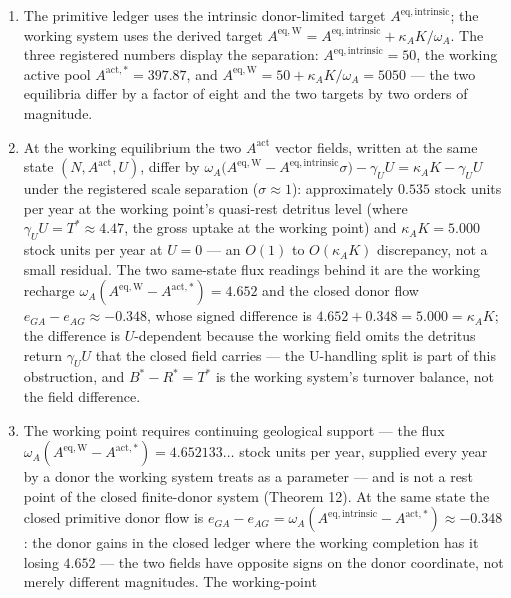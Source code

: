 \documentclass[11pt]{article}
\providecommand{\tightlist}{\setlength{\itemsep}{0pt}\setlength{\parskip}{0pt}}
\begin{document}
\begin{enumerate}
\def\labelenumi{\arabic{enumi}.}
\tightlist
\item
  The primitive ledger uses the intrinsic donor-limited target
  \(A^{\mathrm{eq,intrinsic}}\); the working system uses the derived
  target
  \(A^{\mathrm{eq,W}} = A^{\mathrm{eq,intrinsic}} + \kappa_A K/\omega_A\).
  The three registered numbers display the separation:
  \(A^{\mathrm{eq,intrinsic}} = 50\), the working active pool
  \(A^{\mathrm{act,*}} = 397.87\), and
  \(A^{\mathrm{eq,W}} = 50 + \kappa_A K/\omega_A = 5050\) --- the two
  equilibria differ by a factor of eight and the two targets by two
  orders of magnitude.
\item
  At the working equilibrium the two \(A^{\mathrm{act}}\) vector fields,
  written at the same state \((N, A^{\mathrm{act}}, U)\), differ by
  \(\omega_A\bigl(A^{\mathrm{eq,W}} - A^{\mathrm{eq,intrinsic}}\sigma\bigr) - \gamma_U U = \kappa_A K - \gamma_U U\)
  under the registered scale separation (\(\sigma \approx 1\)):
  approximately \(0.535\) stock units per year at the working point's
  quasi-rest detritus level (where \(\gamma_U U = T^* \approx 4.47\),
  the gross uptake at the working point) and \(\kappa_A K = 5.000\)
  stock units per year at \(U = 0\) --- an \(O(1)\) to \(O(\kappa_A K)\)
  discrepancy, not a small residual. The two same-state flux readings
  behind it are the working recharge
  \(\omega_A(A^{\mathrm{eq,W}} - A^{\mathrm{act,*}}) = 4.652\) and the
  closed donor flow \(e_{GA} - e_{AG} \approx -0.348\), whose signed
  difference is \(4.652 + 0.348 = 5.000 = \kappa_A K\); the difference
  is \(U\)-dependent because the working field omits the detritus return
  \(\gamma_U U\) that the closed field carries --- the U-handling split
  is part of this obstruction, and \(B^* - R^* = T^*\) is the working
  system's turnover balance, not the field difference.
\item
  The working point requires continuing geological support --- the flux
  \(\omega_A(A^{\mathrm{eq,W}} - A^{\mathrm{act,*}}) = 4.652133\ldots\)
  stock units per year, supplied every year by a donor the working
  system treats as a parameter --- and is not a rest point of the closed
  finite-donor system (Theorem 12). At the same state the closed
  primitive donor flow is
  \(e_{GA} - e_{AG} = \omega_A(A^{\mathrm{eq,intrinsic}} - A^{\mathrm{act,*}}) \approx -0.348\):
  the donor gains in the closed ledger where the working completion has
  it losing \(4.652\) --- the two fields have opposite signs on the
  donor coordinate, not merely different magnitudes. The working-point

\end{enumerate}
\end{document}
